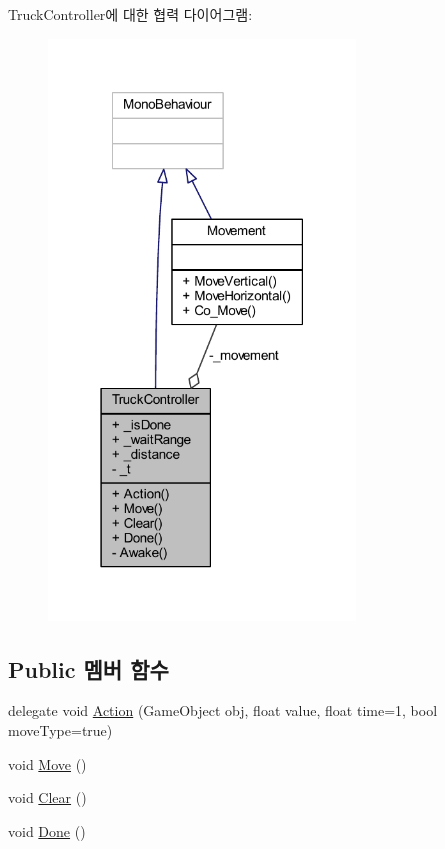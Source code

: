 Truck\+Controller에 대한 협력 다이어그램\+:\nopagebreak
\begin{figure}[H]
\begin{center}
\leavevmode
\includegraphics[width=231pt]{d4/dba/class_truck_controller__coll__graph}
\end{center}
\end{figure}
\subsection*{Public 멤버 함수}
\begin{DoxyCompactItemize}
\item 
delegate void \mbox{\hyperlink{class_truck_controller_ac29bd47e974e18d696bae4ee586e9083}{Action}} (Game\+Object obj, float value, float time=1, bool move\+Type=true)
\item 
void \mbox{\hyperlink{class_truck_controller_a590a6a8f18b118d2d13fea1abb92c7e3}{Move}} ()
\item 
void \mbox{\hyperlink{class_truck_controller_af325273a29ea814c8401d5d4372f577f}{Clear}} ()
\item 
void \mbox{\hyperlink{class_truck_controller_a23970b6ea18c06eadb82692a9cca5129}{Done}} ()
\end{DoxyCompactItemize}
